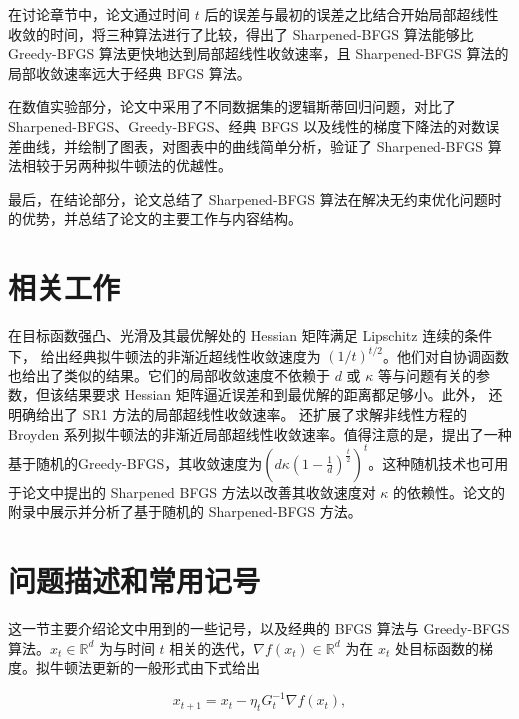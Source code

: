 \documentclass[a4paper,twoside,AutoFakeBold]{article}
\theoremstyle{definition}
\begin{document}
在讨论章节中，论文通过时间 $t$ 后的误差与最初的误差之比结合开始局部超线性收敛的时间，将三种算法进行了比较，得出了 Sharpened-BFGS 算法能够比 Greedy-BFGS 算法更快地达到局部超线性收敛速率，且 Sharpened-BFGS 算法的局部收敛速率远大于经典 BFGS 算法。

在数值实验部分，论文中采用了不同数据集的逻辑斯蒂回归问题，对比了 Sharpened-BFGS、Greedy-BFGS、经典 BFGS 以及线性的梯度下降法的对数误差曲线，并绘制了图表，对图表中的曲线简单分析，验证了 Sharpened-BFGS 算法相较于另两种拟牛顿法的优越性。

最后，在结论部分，论文总结了 Sharpened-BFGS 算法在解决无约束优化问题时的优势，并总结了论文的主要工作与内容结构。

%
\section{相关工作}\label{section:related}
在目标函数强凸、光滑及其最优解处的 Hessian 矩阵满足 Lipschitz 连续的条件下，\citet{qiujiang2020quasinewton1} 给出经典拟牛顿法的非渐近超线性收敛速度为 $({1}/{t})^{t/2}$。他们对自协调函数也给出了类似的结果。它们的局部收敛速度不依赖于 $d$ 或 $\kappa$ 等与问题有关的参数，但该结果要求 Hessian 矩阵逼近误差和到最优解的距离都足够小。此外，\citet{zhangzhihua2021quasinewton1} 还明确给出了 SR1 方法的局部超线性收敛速率。\citet{zhangzhihua2021quasinewton2} 还扩展了求解非线性方程的 Broyden 系列拟牛顿法的非渐近局部超线性收敛速率。值得注意的是，\citet{zhangzhihua2021quasinewton3}提出了一种基于随机的Greedy-BFGS，其收敛速度为$(d\kappa(1 \!-\! \frac{1}{d})^{\frac{t}{2}})^{t}$。这种随机技术也可用于论文中提出的 Sharpened BFGS 方法以改善其收敛速度对 $\kappa$ 的依赖性。论文的附录中展示并分析了基于随机的 Sharpened-BFGS 方法。

%
\section{问题描述和常用记号}\label{section:preliminary}
这一节主要介绍论文中用到的一些记号，以及经典的 BFGS 算法与 Greedy-BFGS 算法。$x_t\in \mathbb{R}^d$ 为与时间 $t$ 相关的迭代，$\nabla f(x_t)\in \mathbb{R}^d$ 为在 $x_t$ 处目标函数的梯度。拟牛顿法更新的一般形式由下式给出

\begin{equation}\label{qn_method}
    x_{t + 1} = x_t - \eta_t G_t^{-1} \nabla{f(x_t)},
\end{equation}
\end{document}
